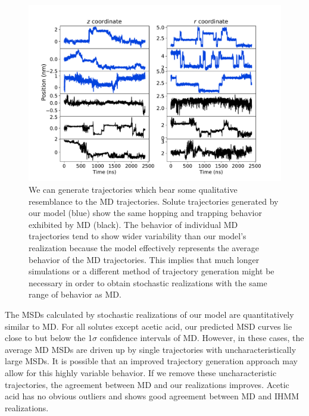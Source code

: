 \documentclass[journal=jpcbfk,manuscript=article]{achemso}
\begin{document}
  \begin{figure}
  \centering
  \includegraphics[width=\textwidth]{trajectory_realizations_MET.pdf}
  \caption{We can generate trajectories which bear some qualitative resemblance to the MD 
  trajectories. Solute trajectories generated by our model (blue) show the same
  hopping and trapping behavior exhibited by MD (black). The behavior of individual 
  MD trajectories tend to show wider variability than our model's realization because
  the model effectively represents the average behavior of the MD trajectories. This 
  implies that much longer simulations or a different method of trajectory generation might
  be necessary in order to obtain stochastic realizations with the same range of behavior
  as MD.
  }\label{fig:trajectory_realizations_MET}
  \end{figure}
  
  The MSDs calculated by stochastic realizations of our model are quantitatively similar to
  MD. For all solutes except acetic acid, our predicted MSD curves lie close to but below the
  1$\sigma$ confidence intervals of MD. However, in these cases, the average MD MSDs are 
  driven up by single trajectories with uncharacteristically large MSDs. It is possible that
  an improved trajectory generation approach may allow for this highly variable behavior.
  If we remove these uncharacteristic trajectories, the agreement between MD and our realizations
  improves. Acetic acid has no obvious outliers and shows good agreement between MD and
  IHMM realizations.
  
\end{document}
